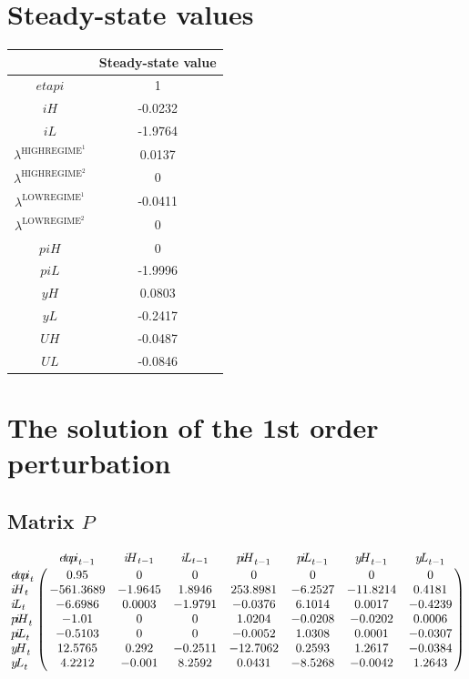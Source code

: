 

\section{Steady-state values}


\begin{tabular}{c|c|}
  & Steady-state value\\
\hline
${e\!t\!a\!p\!i}$ & 1 \\
${i\!H}$ & -0.0232 \\
${i\!L}$ & -1.9764 \\
$\lambda^{\mathrm{HIGHREGIME}^{\mathrm{1}}}$ & 0.0137 \\
$\lambda^{\mathrm{HIGHREGIME}^{\mathrm{2}}}$ & 0 \\
$\lambda^{\mathrm{LOWREGIME}^{\mathrm{1}}}$ & -0.0411 \\
$\lambda^{\mathrm{LOWREGIME}^{\mathrm{2}}}$ & 0 \\
${p\!i\!H}$ & 0 \\
${p\!i\!L}$ & -1.9996 \\
${y\!H}$ & 0.0803 \\
${y\!L}$ & -0.2417 \\
${U\!H}$ & -0.0487 \\
${U\!L}$ & -0.0846 \\
\hline
\end{tabular}


\section{The solution of the 1st order perturbation}

\subsection*{Matrix $P$}

$$\bordermatrix{
~ & {e\!t\!a\!p\!i}_{t-1} & {i\!H}_{t-1} & {i\!L}_{t-1} & {p\!i\!H}_{t-1} & {p\!i\!L}_{t-1} & {y\!H}_{t-1} & {y\!L}_{t-1} \cr
{e\!t\!a\!p\!i}_{t} & 0.95 & 0 & 0 & 0 & 0 & 0 & 0 \cr
{i\!H}_{t} & -561.3689 & -1.9645 & 1.8946 & 253.8981 & -6.2527 & -11.8214 & 0.4181 \cr
{i\!L}_{t} & -6.6986 & 0.0003 & -1.9791 & -0.0376 & 6.1014 & 0.0017 & -0.4239 \cr
{p\!i\!H}_{t} & -1.01 & 0 & 0 & 1.0204 & -0.0208 & -0.0202 & 0.0006 \cr
{p\!i\!L}_{t} & -0.5103 & 0 & 0 & -0.0052 & 1.0308 & 0.0001 & -0.0307 \cr
{y\!H}_{t} & 12.5765 & 0.292 & -0.2511 & -12.7062 & 0.2593 & 1.2617 & -0.0384 \cr
{y\!L}_{t} & 4.2212 & -0.001 & 8.2592 & 0.0431 & -8.5268 & -0.0042 & 1.2643 \cr
}$$

